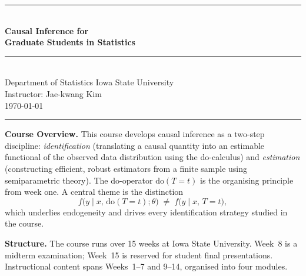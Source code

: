 \documentclass[12pt]{article}
\begin{document}

\thispagestyle{empty}
\begin{center}
  \vspace*{1.2cm}
  {\color{darkblue}\rule{\linewidth}{2pt}}\\[12pt]
  {\Huge\bfseries\color{darkblue}
    Causal Inference for\\[6pt] Graduate Students in Statistics}\\[12pt]
  {\color{midblue}\rule{\linewidth}{1pt}}\\[16pt]
  {\large Department of Statistics \quad\textbullet\quad Iowa State University}\\[8pt]
  {\large Instructor: Jae-kwang Kim}\\[8pt]
  {\normalsize \today}\\[20pt]
  {\color{darkblue}\rule{\linewidth}{2pt}}
\end{center}

\vspace{0.8cm}

\begin{mdframed}[
  backgroundcolor=lightblue, linecolor=midblue, linewidth=1.5pt,
  innerleftmargin=14pt, innerrightmargin=14pt,
  innertopmargin=10pt, innerbottommargin=10pt]
\noindent\textbf{\color{darkblue}Course Overview.}
This course develops causal inference as a two-step discipline:
\emph{identification} (translating a causal quantity into an estimable
functional of the observed data distribution using the do-calculus) and
\emph{estimation} (constructing efficient, robust estimators from a finite
sample using semiparametric theory). The do-operator $\mathrm{do}(T{=}t)$
is the organising principle from week one. A central theme is the distinction
\[
  f\!\bigl(y \mid x,\,\mathrm{do}(T{=}t);\theta\bigr)
  \;\neq\;
  f\!\bigl(y \mid x,\, T{=}t\bigr),
\]
which underlies endogeneity and drives every identification strategy studied
in the course.

\medskip
\noindent\textbf{Structure.} The course runs over 15 weeks at Iowa State
University. Week~8 is a midterm examination; Week~15 is reserved for
student final presentations. Instructional content spans Weeks~1--7 and
9--14, organised into four modules.
\end{mdframed}

\newpage
\tableofcontents
\newpage

\end{document}
